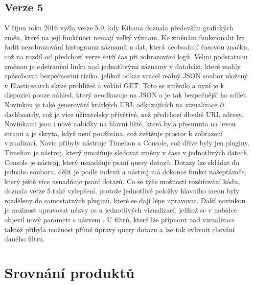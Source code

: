 \documentclass[czech,BP]{thesiskiv}
\begin{document}
 \subsection{Verze 5}
 V říjnu roku 2016 vyšla verze 5.0, kdy Kibana doznala především grafických změn, které na její funkčnost nemají velký význam. Ke změnám funkcionalit lze řadit nezobrazování histogramu záznamů u dat, která neobsahují časovou značku, což na rozdíl od předchozí verze šetří čas při zobrazování logů. Velmi podstatnou změnou je odstranění linku nad jednotlivými záznamy v databázi, které mohly způsobovat bezpečnostní riziko, jelikož odkaz vracel reálný JSON soubor uložený v Elasticsearch skrze prohlížeč a volání GET. Toto se změnilo a nyní je k dispozici pouze náhled, který neodkazuje na JSON a je tak bezpečnější ho sdílet. Novinkou je také generování krátkých URL odkazujících na vizualizace či dashboardy, což je více uživatelsky přívětivé, než předchozí dlouhé URL adresy. Novinkami jsou i nové nabídky na hlavní liště, která byla přesunuta na levou stranu a je skryta, když není používána, což zvětšuje prostor k zobrazení vizualizací. Navíc přibyly nástroje Timelion a Console, což dříve byly jen pluginy. Timelion je nástroj, který umožňuje sledovat změny v čase v jednotlivých datech. Console je nástroj, který usnadňuje psaní query dotazů. Dotazy lze skládat do jednoho souboru, dělit je podle indexů a nástroj má dokonce funkci našeptávače, který ještě více usnadňuje psaní dotazů. Co se týče možností rozšiřování kódu, doznala verze 5 také vylepšení, protože jednotlivé položky hlavního menu byly rozděleny do samostatných pluginů, které se dají lépe upravovat. Další novinkou je možnost upravovat názvy os u jednotlivých vizualizací, jelikož se v nabídce objevil nový parametr s názvem . U filtrů, které lze připnout nad vizualizace taktéž přibyla možnost přímé úpravy query dotazu a lze tak ovlivnit chování daného filtru. \cite{Kibana5intro}

 \iffalse
\section{Srovnání produktů}
\end{document}
